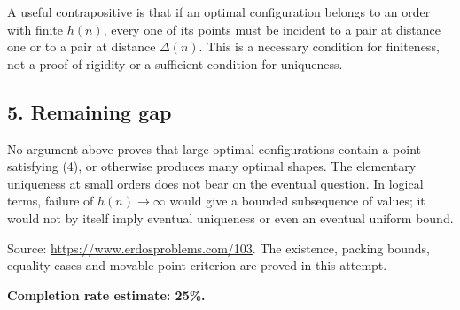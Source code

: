 A useful contrapositive is that if an optimal configuration belongs to an order with finite $h(n)$, every one of its points must be incident to a pair at distance one or to a pair at distance $\Delta(n)$. This is a necessary condition for finiteness, not a proof of rigidity or a sufficient condition for uniqueness.

\subsection*{5. Remaining gap}
No argument above proves that large optimal configurations contain a point satisfying (4), or otherwise produces many optimal shapes. The elementary uniqueness at small orders does not bear on the eventual question. In logical terms, failure of $h(n)\to\infty$ would give a bounded subsequence of values; it would not by itself imply eventual uniqueness or even an eventual uniform bound.

Source: \url{https://www.erdosproblems.com/103}. The existence, packing bounds, equality cases and movable-point criterion are proved in this attempt.

\textbf{Completion rate estimate: 25\%.}

